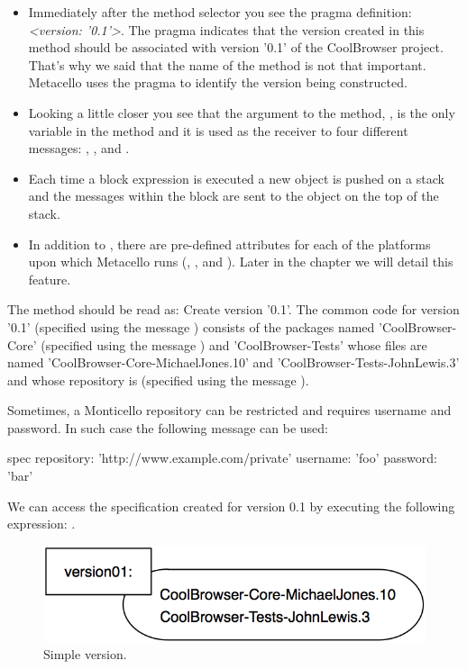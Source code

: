 \documentclass[a4paper,10pt,twoside]{book}
\begin{document}
\begin{itemize}
\item Immediately after the method selector you see the pragma definition:  {\em <version: '0.1'>}. The pragma indicates that the version created in this method should be associated with version '0.1' of the CoolBrowser project. That's why we said that the name of the method is not that important. Metacello uses the pragma to identify the version being constructed.

\item Looking a little closer you see that the argument to the method, , is the only variable in
the method and it is used as the receiver to four different messages:    ,    ,    and  .

\item Each time a block expression is executed a new object is pushed on a stack and the messages within the block are sent to the object on the top of the stack.

\item In addition to , there are pre-defined attributes for each of the platforms upon which Metacello runs (, ,  and ). Later in the chapter we will detail this feature. 
\end{itemize}


The  method  should be read as: Create version '0.1'. The common code for version '0.1' (specified using the message ) consists of the packages named 'CoolBrowser-Core' (specified using the message ) and 'CoolBrowser-Tests'  whose files are named 'CoolBrowser-Core-MichaelJones.10' and 'CoolBrowser-Tests-JohnLewis.3' and whose repository is  (specified using the message ).

Sometimes, a Monticello repository can be restricted and requires username and password. In such case the following message can be used:

\begin{code}{}
         spec repository: 'http://www.example.com/private' username: 'foo' password: 'bar' 
\end{code}

We can access the specification created for version 0.1 by executing the following expression: . 

\begin{figure}
\begin{center}
\includegraphics[width=0.6\linewidth]{version01}
\caption{Simple version.}
\end{center}
\end{figure}
\end{document}
